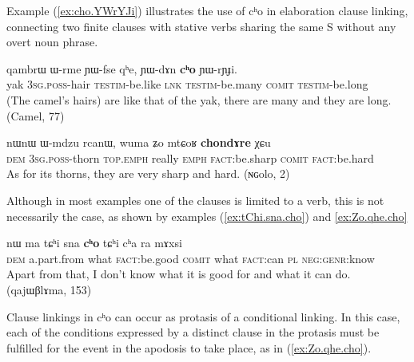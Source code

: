 \documentclass[oldfontcommands,oneside,a4paper,11pt]{article}
\newcommand{\ipa}[1]{{\phon \mbox{#1}}} %
\newcommand{\refb}[1]{(\ref{#1})}
\begin{document}
Example \refb{ex:cho.YWrYJi} illustrates the use of \ipa{cʰo} in elaboration clause linking, connecting two finite clauses with stative verbs sharing the same S without any overt noun phrase.

\begin{exe}
\ex \label{ex:cho.YWrYJi}
\gll
\ipa{qambrɯ}  	\ipa{ɯ-rme}  	\ipa{ɲɯ-fse}  	\ipa{qʰe,}  	\ipa{ɲɯ-dɤn}  	\ipa{\textbf{cʰo}}  	\ipa{ɲɯ-rɲɟi.}  \\
yak \textsc{3sg.poss}-hair \textsc{testim}-be.like \textsc{lnk} \textsc{testim}-be.many \textsc{comit} \textsc{testim}-be.long \\
\glt (The camel's hairs) are like that of the yak, there are many and they are long. (Camel, 77)
\end{exe}

\begin{exe}
\ex \label{ex:chondAre}
\gll
\ipa{nɯnɯ}  	\ipa{ɯ-mdzu}  	\ipa{rcanɯ,}  	\ipa{wuma}  	\ipa{ʑo}  	\ipa{mtɕoʁ}  	\ipa{\textbf{chondɤre}}  	\ipa{χɕu}  \\
\textsc{dem} \textsc{3sg.poss}-thorn \textsc{top.emph} really \textsc{emph} \textsc{fact}:be.sharp \textsc{comit} \textsc{fact}:be.hard \\
\glt As for its thorns, they are very sharp and hard. (ɴɢolo, 2)
\end{exe}

Although in most examples one of the clauses is limited to a verb, this is not necessarily the case, as shown by   examples \refb{ex:tChi.sna.cho} and \ref{ex:Zo.qhe.cho}

\begin{exe}
\ex \label{ex:tChi.sna.cho}
\gll
\ipa{nɯ}  	\ipa{ma}  	 \ipa{tɕʰi}  	\ipa{sna}  	\ipa{\textbf{cʰo}}  	\ipa{tɕʰi}  	\ipa{cʰa}  	\ipa{ra}  	\ipa{mɤxsi}  \\
\textsc{dem} a.part.from what \textsc{fact}:be.good \textsc{comit} what \textsc{fact}:can \textsc{pl} \textsc{neg:genr}:know\\
\glt Apart from that, I don't know what it is good for and what it can do. (qajɯβlɤma, 153)
\end{exe}

Clause linkings in \ipa{cʰo} can occur as protasis of a conditional linking. In this case, each of the conditions expressed by a distinct clause in the protasis must be fulfilled for the event in the apodosis to take place, as in \refb{ex:Zo.qhe.cho}.
\end{document}
